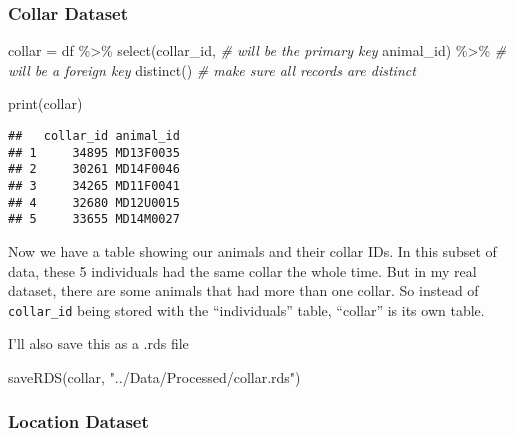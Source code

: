 \documentclass[
]{book}
\newenvironment{Shaded}{\begin{snugshade}}{\end{snugshade}}
\newcommand{\CommentTok}[1]{\textcolor[rgb]{0.56,0.35,0.01}{\textit{#1}}}
\newcommand{\FunctionTok}[1]{\textcolor[rgb]{0.00,0.00,0.00}{#1}}
\newcommand{\NormalTok}[1]{#1}
\newcommand{\OtherTok}[1]{\textcolor[rgb]{0.56,0.35,0.01}{#1}}
\newcommand{\SpecialCharTok}[1]{\textcolor[rgb]{0.00,0.00,0.00}{#1}}
\newcommand{\StringTok}[1]{\textcolor[rgb]{0.31,0.60,0.02}{#1}}
\begin{document}
\hypertarget{collar-dataset}{%
\subsubsection{Collar Dataset}\label{collar-dataset}}

\begin{Shaded}
\begin{Highlighting}[]
\NormalTok{collar }\OtherTok{=}\NormalTok{ df }\SpecialCharTok{\%\textgreater{}\%}
  \FunctionTok{select}\NormalTok{(collar\_id, }\CommentTok{\# will be the primary key}
\NormalTok{         animal\_id) }\SpecialCharTok{\%\textgreater{}\%} \CommentTok{\# will be a foreign key}
  \FunctionTok{distinct}\NormalTok{() }\CommentTok{\# make sure all records are distinct}

\FunctionTok{print}\NormalTok{(collar)}
\end{Highlighting}
\end{Shaded}

\begin{verbatim}
##   collar_id animal_id
## 1     34895 MD13F0035
## 2     30261 MD14F0046
## 3     34265 MD11F0041
## 4     32680 MD12U0015
## 5     33655 MD14M0027
\end{verbatim}

Now we have a table showing our animals and their collar IDs. In this subset of data, these 5 individuals had the same collar the whole time. But in my real dataset, there are some animals that had more than one collar. So instead of \texttt{collar\_id} being stored with the ``individuals'' table, ``collar'' is its own table.

I'll also save this as a .rds file

\begin{Shaded}
\begin{Highlighting}[]
\FunctionTok{saveRDS}\NormalTok{(collar, }\StringTok{"../Data/Processed/collar.rds"}\NormalTok{)}
\end{Highlighting}
\end{Shaded}

\hypertarget{location-dataset}{%
\subsubsection{Location Dataset}\label{location-dataset}}
\end{document}
